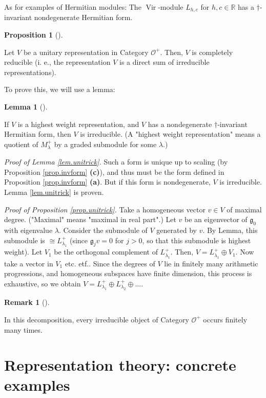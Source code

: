 \documentclass
[numbers=enddot,12pt,final,onecolumn,german,notitlepage]{scrartcl}%
\theoremstyle{definition}
\newtheorem{lem}[theo]{Lemma}
\newenvironment{lemma}[1][]
{\begin{lem}[#1]\begin{leftbar}}
{\end{leftbar}\end{lem}}
\newtheorem{prop}[theo]{Proposition}
\newenvironment{proposition}[1][]
{\begin{prop}[#1]\begin{leftbar}}
{\end{leftbar}\end{prop}}
\newtheorem{remk}[theo]{Remark}
\newenvironment{remark}[1][]
{\begin{remk}[#1]\begin{leftbar}}
{\end{leftbar}\end{remk}}
\begin{document}
As for examples of Hermitian modules: The $\operatorname*{Vir}$-module
$L_{h,c}$ for $h,c\in\mathbb{R}$ has a $\dag$-invariant nondegenerate
Hermitian form.

\begin{proposition}
\label{prop.unitrick}Let $V$ be a unitary representation in Category
$\mathcal{O}^{+}$. Then, $V$ is completely reducible (i. e., the
representation $V$ is a direct sum of irreducible representations).
\end{proposition}

To prove this, we will use a lemma:

\begin{lemma}
\label{lem.unitrick}If $V$ is a highest weight representation, and $V$ has a
nondegenerate $\dag$-invariant Hermitian form, then $V$ is irreducible. (A
"highest weight representation" means a quotient of $M_{\lambda}^{+}$ by a
graded submodule for some $\lambda$.)
\end{lemma}

\textit{Proof of Lemma \ref{lem.unitrick}.} Such a form is unique up to
scaling (by Proposition \ref{prop.invform} \textbf{(c)}), and thus must be the
form defined in Proposition \ref{prop.invform} \textbf{(a)}. But if this form
is nondegenerate, $V$ is irreducible. Lemma \ref{lem.unitrick} is proven.

\textit{Proof of Proposition \ref{prop.unitrick}.} Take a homogeneous vector
$v\in V$ of maximal degree. ("Maximal" means "maximal in real part".) Let $v$
be an eigenvector of $\mathfrak{g}_{0}$ with eigenvalue $\lambda$. Consider
the submodule of $V$ generated by $v$. By Lemma, this submodule is $\cong
L_{\lambda_{1}}^{+}$ (since $\mathfrak{g}_{j}v=0$ for $j>0$, so that this
submodule is highest weight). Let $V_{1}$ be the orthogonal complement of
$L_{\lambda_{1}}^{+}$. Then, $V=L_{\lambda_{1}}^{+}\oplus V_{1}$. Now take a
vector in $V_{1}$ etc. etf.. Since the degrees of $V$ lie in finitely many
arithmetic progressions, and homogeneous subspaces have finite dimension, this
process is exhaustive, so we obtain $V=L_{\lambda_{1}}^{+}\oplus
L_{\lambda_{2}}^{+}\oplus...$.

\begin{remark}
In this decomposition, every irreducible object of Category $\mathcal{O}^{+}$
occurs finitely many times.
\end{remark}

\section{Representation theory: concrete examples}
\end{document}
